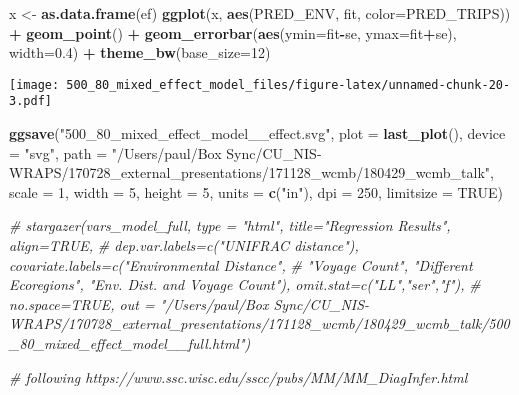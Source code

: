 \documentclass[]{article}
\newenvironment{Shaded}{\begin{snugshade}}{\end{snugshade}}
\newcommand{\KeywordTok}[1]{\textcolor[rgb]{0.13,0.29,0.53}{\textbf{#1}}}
\newcommand{\DataTypeTok}[1]{\textcolor[rgb]{0.13,0.29,0.53}{#1}}
\newcommand{\DecValTok}[1]{\textcolor[rgb]{0.00,0.00,0.81}{#1}}
\newcommand{\FloatTok}[1]{\textcolor[rgb]{0.00,0.00,0.81}{#1}}
\newcommand{\StringTok}[1]{\textcolor[rgb]{0.31,0.60,0.02}{#1}}
\newcommand{\CommentTok}[1]{\textcolor[rgb]{0.56,0.35,0.01}{\textit{#1}}}
\newcommand{\OtherTok}[1]{\textcolor[rgb]{0.56,0.35,0.01}{#1}}
\newcommand{\OperatorTok}[1]{\textcolor[rgb]{0.81,0.36,0.00}{\textbf{#1}}}
\newcommand{\NormalTok}[1]{#1}
\begin{document}
\begin{Shaded}
\begin{Highlighting}[]
\NormalTok{x <-}\StringTok{ }\KeywordTok{as.data.frame}\NormalTok{(ef)}
\KeywordTok{ggplot}\NormalTok{(x, }\KeywordTok{aes}\NormalTok{(PRED_ENV, fit, }\DataTypeTok{color=}\NormalTok{PRED_TRIPS)) }\OperatorTok{+}\StringTok{ }
\StringTok{  }\KeywordTok{geom_point}\NormalTok{() }\OperatorTok{+}\StringTok{ }
\StringTok{  }\KeywordTok{geom_errorbar}\NormalTok{(}\KeywordTok{aes}\NormalTok{(}\DataTypeTok{ymin=}\NormalTok{fit}\OperatorTok{-}\NormalTok{se, }\DataTypeTok{ymax=}\NormalTok{fit}\OperatorTok{+}\NormalTok{se), }\DataTypeTok{width=}\FloatTok{0.4}\NormalTok{) }\OperatorTok{+}\StringTok{ }
\StringTok{  }\KeywordTok{theme_bw}\NormalTok{(}\DataTypeTok{base_size=}\DecValTok{12}\NormalTok{)}
\end{Highlighting}
\end{Shaded}

\texttt{[image: 500\_80\_mixed\_effect\_model\_files/figure-latex/unnamed-chunk-20-3.pdf]}

\begin{Shaded}
\begin{Highlighting}[]
\KeywordTok{ggsave}\NormalTok{(}\StringTok{"500_80_mixed_effect_model__effect.svg"}\NormalTok{, }\DataTypeTok{plot =} \KeywordTok{last_plot}\NormalTok{(), }\DataTypeTok{device =} \StringTok{"svg"}\NormalTok{, }\DataTypeTok{path =} \StringTok{"/Users/paul/Box Sync/CU_NIS-WRAPS/170728_external_presentations/171128_wcmb/180429_wcmb_talk"}\NormalTok{,}
  \DataTypeTok{scale =} \DecValTok{1}\NormalTok{, }\DataTypeTok{width =} \DecValTok{5}\NormalTok{, }\DataTypeTok{height =} \DecValTok{5}\NormalTok{, }\DataTypeTok{units =} \KeywordTok{c}\NormalTok{(}\StringTok{"in"}\NormalTok{),}
  \DataTypeTok{dpi =} \DecValTok{250}\NormalTok{, }\DataTypeTok{limitsize =} \OtherTok{TRUE}\NormalTok{)}



\CommentTok{# stargazer(vars_model_full, type = "html", title="Regression Results", align=TRUE,}
\CommentTok{#             dep.var.labels=c("UNIFRAC distance"), covariate.labels=c("Environmental Distance",}
\CommentTok{#             "Voyage Count", "Different Ecoregions", "Env. Dist. and Voyage Count"), omit.stat=c("LL","ser","f"),}
\CommentTok{#             no.space=TRUE, out = "/Users/paul/Box Sync/CU_NIS-WRAPS/170728_external_presentations/171128_wcmb/180429_wcmb_talk/500_80_mixed_effect_model__full.html")}

\CommentTok{# following https://www.ssc.wisc.edu/sscc/pubs/MM/MM_DiagInfer.html}
\end{Highlighting}
\end{Shaded}
\end{document}
